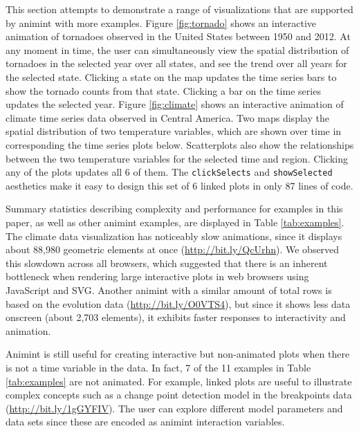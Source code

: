 \documentclass[12pt,]{article}
\theoremstyle{definition}
\theoremstyle{definition}
\theoremstyle{remark}
\begin{document}
This section attempts to demonstrate a range of visualizations that are
supported by animint with more examples. Figure \ref{fig:tornado} shows
an interactive animation of tornadoes observed in the United States
between 1950 and 2012. At any moment in time, the user can
simultaneously view the spatial distribution of tornadoes in the
selected year over all states, and see the trend over all years for the
selected state. Clicking a state on the map updates the time series bars
to show the tornado counts from that state. Clicking a bar on the time
series updates the selected year. Figure \ref{fig:climate} shows an
interactive animation of climate time series data observed in Central
America. Two maps display the spatial distribution of two temperature
variables, which are shown over time in corresponding the time series
plots below. Scatterplots also show the relationships between the two
temperature variables for the selected time and region. Clicking any of
the plots updates all 6 of them. The \texttt{clickSelects} and
\texttt{showSelected} aesthetics make it easy to design this set of 6
linked plots in only 87 lines of code.

Summary statistics describing complexity and performance for examples in
this paper, as well as other animint examples, are displayed in Table
\ref{tab:examples}. The climate data visualization has noticeably slow
animations, since it displays about 88,980 geometric elements at once
(\url{http://bit.ly/QcUrhn}). We observed this slowdown across all
browsers, which suggested that there is an inherent bottleneck when
rendering large interactive plots in web browsers using JavaScript and
SVG. Another animint with a similar amount of total rows is based on the
evolution data (\url{http://bit.ly/O0VTS4}), but since it shows less
data onscreen (about 2,703 elements), it exhibits faster responses to
interactivity and animation.

Animint is still useful for creating interactive but non-animated plots
when there is not a time variable in the data. In fact, 7 of the 11
examples in Table \ref{tab:examples} are not animated. For example,
linked plots are useful to illustrate complex concepts such as a change
point detection model in the breakpoints data
(\url{http://bit.ly/1gGYFIV}). The user can explore different model
parameters and data sets since these are encoded as animint interaction
variables.
\end{document}

